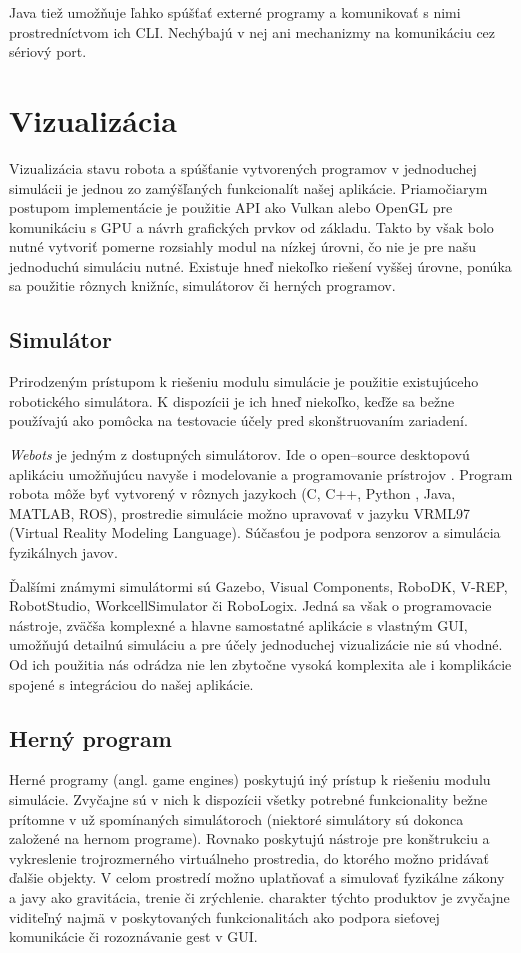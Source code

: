 Java tiež umožňuje ľahko spúšťať externé programy a komunikovať s nimi prostredníctvom ich CLI. Nechýbajú v nej ani mechanizmy na komunikáciu cez sériový port.


\section{Vizualizácia}
Vizualizácia stavu robota a spúšťanie vytvorených programov v jednoduchej simulácii je jednou zo zamýšľaných funkcionalít našej aplikácie. Priamočiarym postupom implementácie je použitie API ako Vulkan alebo OpenGL pre komunikáciu s GPU a návrh grafických prvkov od základu. Takto by však bolo nutné vytvoriť pomerne rozsiahly modul na nízkej úrovni, čo nie je pre našu jednoduchú simuláciu nutné. Existuje hneď niekoľko riešení vyššej úrovne, ponúka sa použitie rôznych knižníc, simulátorov či herných programov.

\subsection{Simulátor}
Prirodzeným prístupom k riešeniu modulu simulácie je použitie existujúceho robotického simulátora. K dispozícii je ich hneď niekoľko, keďže sa bežne používajú ako pomôcka na testovacie účely pred skonštruovaním zariadení.

\textit{Webots} je jedným z dostupných simulátorov. Ide o open--source desktopovú aplikáciu umožňujúcu navyše i modelovanie a programovanie prístrojov \cite{Webots}. Program robota môže byť vytvorený v rôznych jazykoch (C, C++, Python , Java, MATLAB, ROS), prostredie simulácie možno upravovať v jazyku VRML97 (Virtual Reality Modeling Language). Súčasťou je podpora senzorov a simulácia fyzikálnych javov.

Ďalšími známymi simulátormi sú Gazebo, Visual Components, RoboDK, V-REP, RobotStudio, WorkcellSimulator či RoboLogix. Jedná sa však o programovacie nástroje, zväčša komplexné a hlavne samostatné aplikácie s vlastným GUI, umožňujú detailnú simuláciu a pre účely jednoduchej vizualizácie nie sú vhodné. Od ich použitia nás odrádza nie len zbytočne vysoká komplexita ale i komplikácie spojené s integráciou do našej aplikácie.

\subsection{Herný program}
\label{sub:herny-program}
Herné programy (angl. game engines) poskytujú iný prístup k riešeniu modulu simulácie. Zvyčajne sú v nich k dispozícii všetky potrebné funkcionality bežne prítomne v už spomínaných simulátoroch (niektoré simulátory sú dokonca založené na hernom programe). Rovnako poskytujú nástroje pre konštrukciu a vykreslenie trojrozmerného virtuálneho prostredia, do ktorého možno pridávať ďalšie objekty. V celom prostredí možno uplatňovať a simulovať fyzikálne zákony a javy ako gravitácia, trenie či zrýchlenie.  charakter týchto produktov je zvyčajne viditeľný najmä v poskytovaných funkcionalitách ako podpora sieťovej komunikácie či rozoznávanie gest v GUI.

